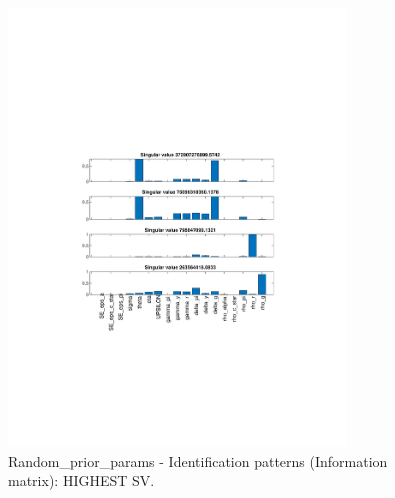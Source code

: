 
\begin{figure}[H]
\centering 
\includegraphics[width=0.8\textwidth]{monetary/identification/monetary_ident_pattern_Random_prior_params_2}
\caption{Random_prior_params - Identification patterns (Information matrix): HIGHEST SV.}\label{Fig:ident_pattern:Random_prior_params:2}
\end{figure}

